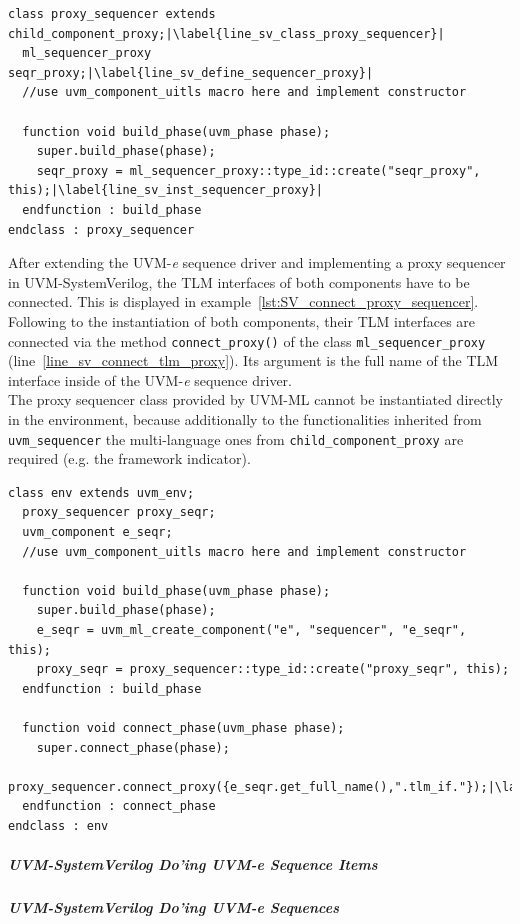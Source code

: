 \lstset{language=SystemVerilog, numbers = left, escapechar=|, breaklines=true}
\begin{lstlisting}[frame=htrbl, caption={SystemVerilog: creating a proxy sequencer},
label={lst:SV_proxy_sequencer}]
class proxy_sequencer extends child_component_proxy;|\label{line_sv_class_proxy_sequencer}|
  ml_sequencer_proxy seqr_proxy;|\label{line_sv_define_sequencer_proxy}|
  //use uvm_component_uitls macro here and implement constructor
  
  function void build_phase(uvm_phase phase);
    super.build_phase(phase);
    seqr_proxy = ml_sequencer_proxy::type_id::create("seqr_proxy", this);|\label{line_sv_inst_sequencer_proxy}|
  endfunction : build_phase
endclass : proxy_sequencer
\end{lstlisting}
After extending the UVM-\textit{e} sequence driver and implementing a proxy sequencer in UVM-SystemVerilog, the TLM interfaces of both components have to be connected. This is displayed in example~\ref{lst:SV_connect_proxy_sequencer}. Following to the instantiation of both components, their TLM interfaces are connected via the method \lstinline$connect_proxy()$ of the class \lstinline$ml_sequencer_proxy$ (line~\ref{line_sv_connect_tlm_proxy}). Its argument is the full name of the TLM interface inside of the UVM-\textit{e} sequence driver.\\
The proxy sequencer class provided by UVM-ML cannot be instantiated directly in the environment, because additionally to the functionalities inherited from \lstinline$uvm_sequencer$ the multi-language ones from \lstinline$child_component_proxy$ are required (e.g. the framework indicator).
\lstset{language=SystemVerilog, numbers = left, escapechar=|, breaklines=true}
\begin{lstlisting}[frame=htrbl, caption={SystemVerilog: connecting proxy sequencer and foreign sequencer},
label={lst:SV_connect_proxy_sequencer}]
class env extends uvm_env;
  proxy_sequencer proxy_seqr;
  uvm_component e_seqr;
  //use uvm_component_uitls macro here and implement constructor
  
  function void build_phase(uvm_phase phase);
    super.build_phase(phase);
    e_seqr = uvm_ml_create_component("e", "sequencer", "e_seqr", this);
    proxy_seqr = proxy_sequencer::type_id::create("proxy_seqr", this);
  endfunction : build_phase
  
  function void connect_phase(uvm_phase phase);
    super.connect_phase(phase);
    proxy_sequencer.connect_proxy({e_seqr.get_full_name(),".tlm_if."});|\label{line_sv_connect_tlm_proxy}|
  endfunction : connect_phase
endclass : env
\end{lstlisting}
\subparagraph{UVM-SystemVerilog Do'ing UVM-\textit{e} Sequence Items}
\subparagraph{UVM-SystemVerilog Do'ing UVM-\textit{e} Sequences}

